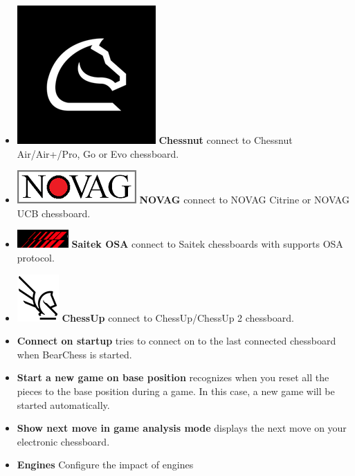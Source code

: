 \documentclass[11pt,a4paper]{article}
\begin{document}
\begin{itemize}
		\item  \includegraphics[scale=0.1]{chessnut.png} \textbf{Chessnut} connect to Chessnut Air/Air+/Pro, Go or Evo chessboard.		
		\item  \includegraphics[scale=0.3]{novag48.PNG} \textbf{NOVAG} connect to NOVAG Citrine or NOVAG UCB chessboard.			
		\item  \includegraphics[scale=0.4]{Saitek_logo.PNG} \textbf{Saitek OSA} connect to Saitek chessboards with supports OSA protocol.		
		\item  \includegraphics[scale=0.4]{ChessUp.png} \textbf{ChessUp} connect to ChessUp/ChessUp 2 chessboard.
		\item \textbf{Connect on startup} tries to connect on to the last connected chessboard when BearChess is started. 	
		\item \textbf{Start a new game on base position} recognizes when you reset all the pieces to the base position during a game. In this case, a new game will be started automatically.
		\item \textbf{Show next move in game analysis mode} displays the next move on your electronic chessboard.
		\item \textbf{Engines} Configure the impact of engines
		
	\end{itemize}
	
\end{document}
